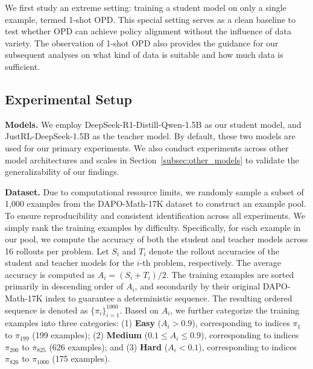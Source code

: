 We first study an extreme setting: training a student model on only a single example, termed 1-shot OPD. This special setting serves as a clean baseline to test whether OPD can achieve policy alignment without the influence of data variety. The observation of 1-shot OPD also provides the guidance for our subsequent analyses on what kind of data is suitable and how much data is sufficient.

\subsection{Experimental Setup}
\label{subsec:setup}

\textbf{Models.} We employ DeepSeek-R1-Distill-Qwen-1.5B \citep{guo2025deepseek} as our student model, and JustRL-DeepSeek-1.5B \citep{he2025justrl} as the teacher model. By default, these two models are used for our primary experiments. We also conduct experiments across other model architectures and scales in Section~\ref{subsec:other_models} to validate the generalizability of our findings.

\textbf{Dataset.} Due to computational resource limits, we randomly sample a subset of 1,000 examples from the DAPO-Math-17K dataset \citep{yu2026dapo} to construct an example pool. To ensure reproducibility and consistent identification across all experiments. We simply rank the training examples by difficulty. Specifically, for each example in our pool, we compute the accuracy of both the student and teacher models across 16 rollouts per problem. Let $S_i$ and $T_i$ denote the rollout accuracies of the student and teacher models for the $i$-th problem, respectively. The average accuracy is computed as $A_i = (S_i + T_i)/2$. The training examples are sorted primarily in descending order of $A_i$, and secondarily by their original DAPO-Math-17K index to guarantee a deterministic sequence. The resulting ordered sequence is denoted as $\{\pi_i\}_{i=1}^{1000}$. Based on $A_i$, we further categorize the training examples into three categories: (1) \textbf{Easy} ($A_i > 0.9$), corresponding to indices $\pi_1$ to $\pi_{199}$ (199 examples); (2) \textbf{Medium} ($0.1 \le A_i \le 0.9$), corresponding to indices $\pi_{200}$ to $\pi_{825}$ (626 examples); and (3) \textbf{Hard} ($A_i < 0.1$), corresponding to indices $\pi_{826}$ to $\pi_{1000}$ (175 examples).


